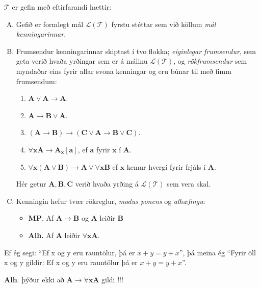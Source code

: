 \documentclass[12pt]{article}
\begin{document}
\begin{skgr} $\mathcal{T}$ er gefin með
  eftirfarandi hættir:
  \begin{enumerate}[A.]
  \item Gefið er formlegt mál $\mathcal{L(T)}$ fyrstu stéttar sem við köllum
    \emph{mál kenningarinnar}.
  \item Frumsendur kenningarinnar skiptast í tvo flokka;
    \emph{eiginlegar frumsendur}, sem geta verið hvaða yrðingar sem er á málinu
    $\mathcal{L(T)}$, og \emph{rökfrumsendur} sem myndaðar eins fyrir allar svona
    kenningar og eru búnar til með fimm frumsendum:
    \begin{enumerate}
    \item  $\mathbf{A} \vee \mathbf{A} \rightarrow \mathbf{A} $.
    \item  $ \mathbf{A} \rightarrow \mathbf{B} \vee \mathbf{A}$.
    \item  $ ( \mathbf{A} \rightarrow \mathbf{B}) \rightarrow (\mathbf{C} \vee \mathbf{A} \rightarrow \mathbf{B} \vee \mathbf{C})$.
    \item  $ \forall \mathbf{x} \mathbf{A} \rightarrow \mathbf{A}_{\mathbf{x}} [\mathbf{a}]$, ef $\mathbf{a}$
      fyrir $\mathbf{x}$  í $\mathbf{A}$.
    \item $\forall \mathbf{x} ( \mathbf{A} \vee \mathbf{B} ) \rightarrow \mathbf{A} \vee \forall \mathbf{x} \mathbf{B}$ ef $\mathbf{x}$ kemur hvergi fyrir frjáls í $\mathbf{A}$.
    \end{enumerate}

    Hér getur $\mathbf{A}, \mathbf{B}, \mathbf{C}$ verið hvaða yrðing á $\mathcal{L(T)}$
    sem vera skal.
  \item Kenningin hefur tvær rökreglur, \emph{modus ponens} og \emph{alhæfingu}:
    \begin{itemize}
    \item \textbf{MP}. Af $\mathbf{A} \rightarrow \mathbf{B}$ og $\mathbf{A}$ leiðir $\mathbf{B}$
    \item \textbf{Alh.} Af $\mathbf{A}$ leiðir $\forall \mathbf{x} \mathbf{A}$.
    \end{itemize}
  \end{enumerate}
\end{skgr}

\begin{ath}
  Ef ég segi: ``Ef x og y eru rauntölur, þá er $x + y = y+x$'', þá meina ég
  ``Fyrir öll x og y gildir: Ef x og y eru rauntölur þá er $x  + y = y + x$''.


  \textbf{Alh}. þýður ekki að $\mathbf{A} \rightarrow \forall \mathbf{x} \mathbf{A}$ gildi !!!
\end{ath}
\end{document}
